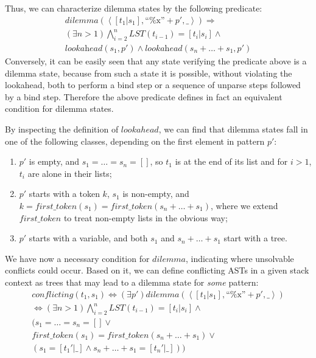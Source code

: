 \documentclass{sigplanconf}
\begin{document}
Thus, we can characterize dilemma states by the following predicate:
\begin{eqnarray*}
\textit{dilemma}(\left<[t_1 | s_1], \mbox{``\%x''}+p', \_\right>)
  \Rightarrow \\
  (\exists n>1)\bigwedge_{i=2}^{n} LST(t_{i-1}) = [t_i | s_i] \land \\
  \textit{lookahead}(s_1,p') \land
  \textit{lookahead}(s_n+\dots+s_1,p')
\end{eqnarray*}
Conversely, it can be easily seen that any state verifying the
predicate above is a dilemma state, because from such a state it is
possible, without violating the lookahead, both to perform a bind step
or a sequence of unparse steps followed by a bind step. Therefore the
above predicate defines in fact an equivalent condition for dilemma states.

By inspecting the definition of $lookahead$, we can find that
dilemma states fall in one of the following classes, depending on
the first element in pattern $p'$:
\begin{enumerate}
\item $p'$ is empty, and $s_1=\dots=s_n=[]$, so $t_1$ is at the end of
its list and for $i>1$, $t_i$ are alone in their lists;
\item $p'$ starts with a token $k$, $s_1$ is non-empty, and $k =
first\_token(s_1) = first\_token(s_n+\dots+s_1)$, where we extend
$first\_token$ to treat non-empty lists in the obvious way;
\item $p'$ starts with a variable, and both $s_1$ and $s_n+\dots+s_1$ start
with a tree.
\end{enumerate}


We have now a necessary condition for $dilemma$, indicating where
unsolvable conflicts could occur. Based on it, we can define
conflicting ASTs in a given stack context as trees that may lead to a
dilemma state for {\em some} pattern:
\begin{eqnarray*}
conflicting(t_1, s_1) \iff 
 (\exists p') dilemma(\left<[t_1 | s_1], \mbox{``\%x''}+p', \_\right>) \\
 \iff (\exists n>1) \bigwedge_{i=2}^{n} LST(t_{i-1}) = [t_i | s_i] \land \\
 (s_1=\dots=s_n=[] \lor \\
  first\_token(s_1) = first\_token(s_n+\dots+s_1) \lor \\
  (s_1=[t_1'|\_] \land s_n+\dots+s_1=[t_n'|\_]))
\end{eqnarray*}
\end{document}
